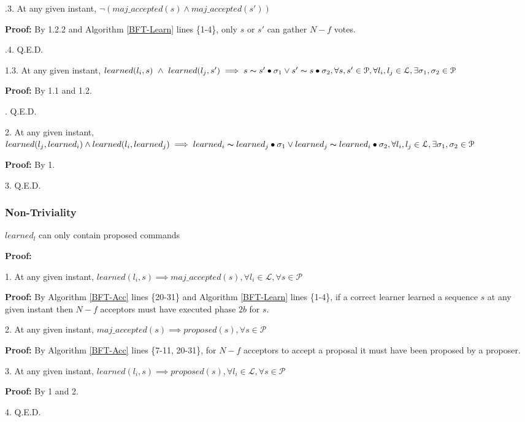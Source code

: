 \indent\indent\indent\indent{}.3. At any given instant, $\neg (maj\_accepted(s) \land maj\_accepted(s'))$ \par
\indent\indent\indent\indent\indent\indent\parbox{\linewidth-\algorithmicindent*6}{\textbf{Proof:} By 1.2.2 and Algorithm \ref{BFT-Learn} lines \{1-4\}, only $s$ or $s'$ can gather $N-f$ votes.}\par
\indent\indent\indent\indent{}.4. Q.E.D. \par
\indent\indent\indent \parbox{\linewidth-\algorithmicindent*3}{1.3. At any given instant, $learned(l_i,s)\ \land\ learned(l_j,s') \implies s \thicksim s' \bullet \sigma_1 \lor s' \thicksim s \bullet \sigma_2, \forall s,s' \in \mathcal{P}, \forall l_i,l_j \in \mathcal{L}, \exists \sigma_1,\sigma_2 \in \mathcal{P}$ }\par
\indent\indent\indent\indent\textbf{Proof:} By 1.1 and 1.2.\par
\indent\indent{}. Q.E.D. \par
\parbox{\linewidth-\algorithmicindent*3}{2. At any given instant, $learned(l_j,learned_i) \land learned(l_i,learned_j) \implies learned_i \thicksim learned_j \bullet \sigma_1 \lor learned_j \thicksim learned_i \bullet \sigma_2, \forall l_i,l_j \in \mathcal{L}, \exists \sigma_1,\sigma_2 \in \mathcal{P}$}\par
\indent\indent\textbf{Proof:} By 1.\par
3. Q.E.D. \par

\subsubsection{Non-Triviality}
\begin{theorem}
$learned_l$ can only contain proposed commands \label{N-T1} \par
\end{theorem} 
\textbf{Proof:} \par
1. At any given instant, $learned(l_i,s) \implies maj\_accepted(s),\forall l_i \in \mathcal{L}, \forall s \in \mathcal{P}$ \par
\indent\indent\parbox{\linewidth}{\textbf{Proof:} By Algorithm \ref{BFT-Acc} lines \{20-31\} and Algorithm \ref{BFT-Learn} lines \{1-4\}, if a correct learner learned a sequence $s$ at any given instant then $N-f$ acceptors must have executed phase $2b$ for $s$.}\par
2. At any given instant, $maj\_accepted(s) \implies proposed(s), \forall s \in \mathcal{P}$ \par
\indent\indent\parbox{\linewidth}{\textbf{Proof:} By Algorithm \ref{BFT-Acc} lines \{7-11, 20-31\}, for $N-f$ acceptors to accept a proposal it must have been proposed by a proposer.}\par
3. At any given instant, $learned(l_i,s) \implies proposed(s),\forall l_i \in \mathcal{L}, \forall s \in \mathcal{P}$ \par
\indent\indent\textbf{Proof:} By 1 and 2. \par
4. Q.E.D. \par

